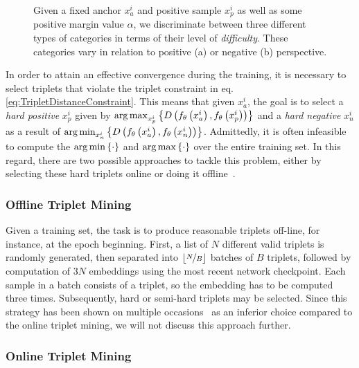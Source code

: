 \begin{figure}[t]
\begin{subfigure}[b]{0.35\textwidth}
        \caption[]{}
    \end{subfigure}
    \caption[Triplet loss categories visualization]{Given a fixed anchor $x_a^i$ and positive sample $x_p^i$ as well as some positive margin value $\alpha$, we discriminate between three different types of categories in terms of their level of \emph{difficulty}. These categories vary in relation to positive (a) or negative (b) perspective.}
    \label{fig:PositiveAndNegativeTripletsCategories}
\end{figure}

In order to attain an effective convergence during the training, it is necessary to select triplets that violate the triplet constraint in eq. \ref{eq:TripletDistanceConstraint}. This means that given $x_a^i$, the goal is to select a \emph{hard positive} $x_p^i$ given by $\operatorname*{arg\,max}_{x_p^i}\left\{ {{D} \left( {f_\theta} \left( x_a^i \right), {f_\theta} \left( x_p^i \right) \right)} \right\}$ and a \emph{hard negative} $x_n^i$ as a result of $\operatorname*{arg\,min}_{x_n^i}\left\{ {{D} \left( {f_\theta} \left( x_a^i \right), {f_\theta} \left( x_n^i \right) \right)} \right\}$. Admittedly, it is often infeasible to compute the $\operatorname*{arg\,min}\left\{ {\cdot} \right\}$ and $\operatorname*{arg\,max}\left\{ {\cdot} \right\}$ over the entire training set. In this regard, there are two possible approaches to tackle this problem, either by selecting these hard triplets online or doing it offline~\cite{schroff2015facenet}.

\subsubsection{Offline Triplet Mining}

Given a training set, the task is to produce reasonable triplets off-line, for instance, at the epoch beginning. First, a list of $N$ different valid triplets is randomly generated, then separated into $\lfloor \nicefrac{N}{B} \rfloor$ batches of $B$ triplets, followed by computation of $3N$ embeddings using the most recent network checkpoint. Each sample in a batch consists of a triplet, so the embedding has to be computed three times. Subsequently, hard or semi-hard triplets may be selected. Since this strategy has been shown on multiple occasions~\cite{schroff2015facenet, hermans2017triplet, kuma2019vehiclereid} as an inferior choice compared to the online triplet mining, we will not discuss this approach further.

\subsubsection{Online Triplet Mining}

